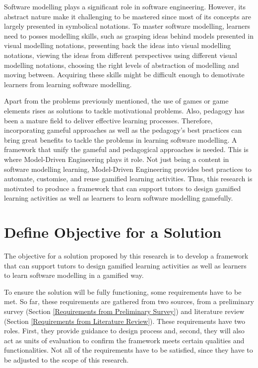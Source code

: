 \documentclass[12pt, a4paper]{report} \usepackage[titletoc]{appendix}
\begin{document}
Software modelling plays a significant role in software engineering. However, its abstract nature make it challenging to be mastered since most of its concepts are largely presented in symbolical notations. To master software modelling, learners need to posses modelling skills, such as grasping ideas behind models presented in visual modelling notations, presenting back the ideas into visual modelling notations, viewing the ideas from different perspectives using different visual modelling notations, choosing the right levels of abstraction of modelling and moving between. Acquiring these skills might be difficult enough to demotivate learners from learning software modelling.

Apart from the problems previously mentioned, the use of games or game elements rises as solutions to tackle motivational problems. Also, pedagogy has been a mature field to deliver effective learning processes. Therefore, incorporating gameful approaches as well as the pedagogy's best practices can bring great benefits to tackle the problems in learning software modelling. A framework that unify the gameful and pedagogical approaches is needed. This is where Model-Driven Engineering plays it role. Not just being a content in software modelling learning, Model-Driven Engineering provides best practices to automate, customise, and reuse gamified learning activities. Thus, this research is motivated to produce a framework that can support tutors to design gamified learning activities as well as learners to learn software modelling gamefully.


\section{Define Objective for a Solution}
The objective for a solution proposed by this research is to develop a framework that can support tutors to design gamified learning activities as well as learners to learn software modelling in a gamified way. 

To ensure the solution will be fully functioning, some requirements have to be met. So far, these requirements are gathered from two sources, from a preliminary survey (Section \ref{Requirements from Preliminary Survey}) and literature review (Section \ref{Requirements from Literature Review}). These requirements have two roles. First, they provide guidance to design process and, second, they will also act as units of evaluation to confirm the framework meets certain qualities and functionalities. Not all of the requirements have to be satisfied, since they have to be adjusted to the scope of this research. 
\end{document}
